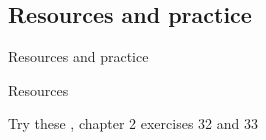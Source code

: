 \documentclass{beamer}
\newcommand{\subtwofive}{Resources and practice}
\begin{document}
    \subsection{\subtwofive}
      \begin{frame}{\subtwofive}
        \begin{block}{Resources}
          
        \end{block}
        \begin{block}{Try these}
          \textcite{dawson_language_2016}, chapter 2 exercises 32 and 33
        \end{block}
      \end{frame}
\end{document}

